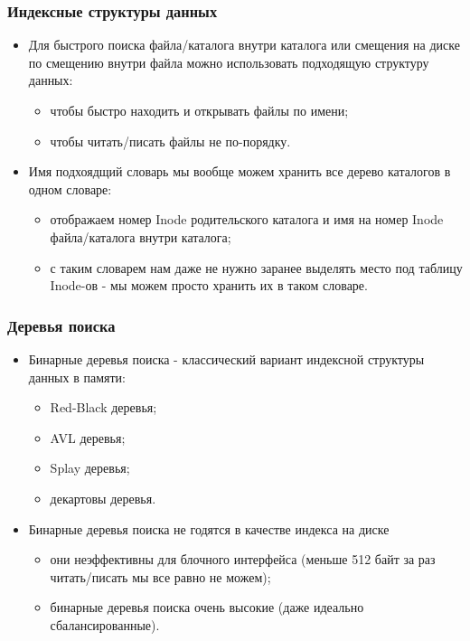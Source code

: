 \begin{frame}
\frametitle{Индексные структуры данных}
\begin{itemize}
  \item Для быстрого поиска файла/каталога внутри каталога или смещения на диске
  по смещению внутри файла можно использовать подходящую структуру данных:
  \begin{itemize}
    \item чтобы быстро находить и открывать файлы по имени;
    \item чтобы читать/писать файлы не по-порядку.
  \end{itemize}
  \item Имя подхоядщий словарь мы вообще можем хранить все дерево каталогов в
  одном словаре:
  \begin{itemize}
    \item отображаем номер Inode родительского каталога и имя на номер Inode
    файла/каталога внутри каталога;
    \item с таким словарем нам даже не нужно заранее выделять место под таблицу
    Inode-ов - мы можем просто хранить их в таком словаре.
  \end{itemize}
\end{itemize}
\end{frame}

\begin{frame}
\frametitle{Деревья поиска}
\begin{itemize}
  \item Бинарные деревья поиска - классический вариант индексной структуры
  данных в памяти:
  \begin{itemize}
    \item Red-Black деревья;
    \item AVL деревья;
    \item Splay деревья;
    \item декартовы деревья.
  \end{itemize}
  \item Бинарные деревья поиска не годятся в качестве индекса на диске
  \begin{itemize}
    \item они неэффективны для блочного интерфейса (меньше 512 байт за раз
    читать/писать мы все равно не можем);
    \item бинарные деревья поиска очень высокие (даже идеально
    сбалансированные).
  \end{itemize}
\end{itemize}
\end{frame}

